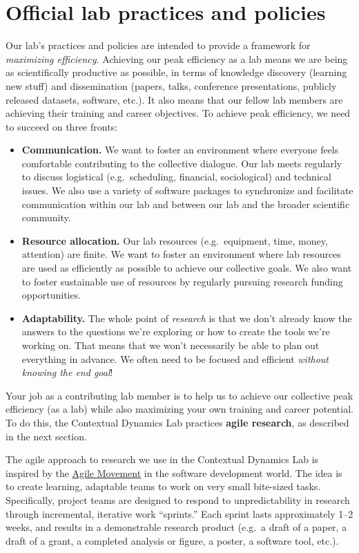 \documentclass{tufte-book} %
\begin{document}
\chapter{Official lab practices and policies}\label{ch:policy}
Our lab's practices and policies are intended to provide a framework
for \textit{maximizing efficiency}.  Achieving our peak efficiency as
a lab means we are being as scientifically productive as possible, in
terms of knowledge discovery (learning new stuff) and dissemination
(papers, talks, conference presentations, publicly released datasets,
software, etc.). It also means that our fellow lab members are
achieving their training and career objectives.  To achieve peak
efficiency, we need to succeed on three fronts:
\begin{itemize}
\item \textbf{Communication.}  We want to foster an environment where
  everyone feels comfortable contributing to the collective dialogue.
  Our lab meets regularly to discuss logistical (e.g.\ scheduling, financial,
  sociological) and technical issues.  We also use a variety of
  software packages to synchronize and facilitate communication within
  our lab and between our lab and the broader scientific community.
\item \textbf{Resource allocation.}  Our lab resources (e.g.\
  equipment, time, money, attention) are finite.  We want to foster an
  environment where lab resources are used as efficiently as possible
  to achieve our collective goals.  We also want to foster
  sustainable use of resources by regularly pursuing research funding opportunities.
\item \textbf{Adaptability.}  The whole point of \textit{research} is that we
  don't already know the answers to the questions we're exploring or
  how to create the tools we're working on.  That means that we won't
  necessarily be able to plan out everything in advance.  We often need to
  be focused and efficient \textit{without knowing the end goal}!
\end{itemize}
Your job as a contributing lab member is to help us to achieve our
collective peak efficiency (as a lab) while also maximizing your own
training and career potential.  To do this, the Contextual Dynamics
Lab practices \textbf{agile research}, as described in the next section.

{}

\noindent The agile approach to research we use in the Contextual Dynamics Lab
is inspired by the \href{http://scrumtrainingseries.com/}{Agile
  Movement} in the software development world.  The idea is to create
learning, adaptable teams to work on very small bite-sized tasks.
Specifically, project teams are designed to respond to
unpredictability in research through incremental, iterative work
``sprints.''  Each sprint lasts approximately 1--2 weeks, and results
in a demonstrable research product (e.g.\ a draft of a paper, a draft
of a grant, a completed analysis or figure, a poster, a software tool,
etc.).
\end{document}
